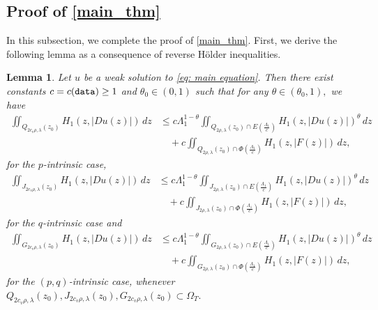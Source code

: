 \documentclass[11pt,oneside, english,reqno,twoside a4paper]{amsart}
\newtheorem{lemma}{Lemma}[section]
\theoremstyle{definition}
\numberwithin{theorem}{section}
\numberwithin{equation}{section}
\begin{document}
\subsection{Proof of \cref{main_thm}}\label{subsec:final_proof}
In this subsection, we complete the proof of \cref{main_thm}. First, we derive the following lemma as a consequence of reverse H\"{o}lder inequalities.
\begin{lemma}\label{LEM6.1}
Let $u$ be a weak solution to \eqref{eq: main equation}. Then there exist constants $c=c(\textnormal{\texttt{data}}) \geq 1$ and $\theta_0\in (0,1)$ such that for any $\theta \in (\theta_0, 1),$ we have
\begin{align}\label{EQQ4.19}
\iint_{Q_{2c_v\rho, \lambda}(z_0)}H_1(z, |D u(z)|)\, dz &\leq c\Lambda_1^{1-\theta}\iint_{Q_{2\rho, \lambda}(z_0) \cap E\left(\frac{\Lambda_1}{c}\right)} H_1(z, |D u(z)|)^\theta\, dz\nonumber\\
&\quad + c\iint_{Q_{2\rho, \lambda}(z_0)\cap \Phi \left(\frac{\Lambda_1}{c}\right)} H_1(z, |F(z)|)\,dz,
\end{align}
for the $p$-intrinsic case,
\begin{align}\label{EQQ4.20}
  \iint_{J_{2c_v\rho, \lambda}(z_0)}H_1(z, |D u(z)|)\, dz &\leq c\Lambda_1^{1-\theta}\iint_{J_{2\rho, \lambda}(z_0) \cap E\left(\frac{\Lambda_1}{c}\right)} H_1(z, |D u(z)|)^\theta\, dz\nonumber\\
&\quad + c\iint_{J_{2\rho, \lambda}(z_0)\cap \Phi \left(\frac{\Lambda_1}{c}\right)} H_1(z, |F(z)|)\,dz,  
\end{align}
for the $q$-intrinsic case and 
\begin{align}\label{EQQ4.21}
  \iint_{G_{2c_v\rho, \lambda}(z_0)}H_1(z, |D u(z)|)\, dz &\leq c\Lambda_1^{1-\theta}\iint_{G_{2\rho, \lambda}(z_0) \cap E\left(\frac{\Lambda_1}{c}\right)} H_1(z, |D u(z)|)^\theta\, dz\nonumber\\
&\quad + c\iint_{G_{2\rho, \lambda}(z_0)\cap \Phi \left(\frac{\Lambda_1}{c}\right)} H_1(z, |F(z)|)\,dz,  
\end{align} for the $(p, q)$-intrinsic case,
whenever $Q_{2c_v\rho, \lambda}(z_0), J_{2c_v\rho, \lambda}(z_0), G_{2c_v\rho, \lambda}(z_0) \subset \Omega_T.$
\end{lemma}
\end{document}
